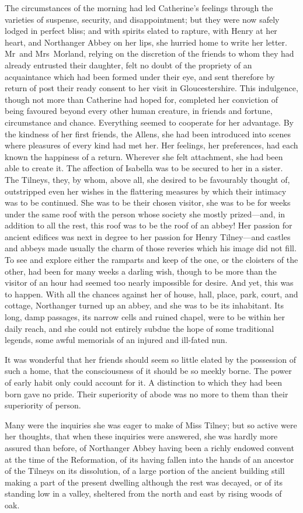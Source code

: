  The circumstances of the morning had led Catherine's feelings through the varieties of suspense, security, and disappointment; but they were now safely lodged in perfect bliss; and with spirits elated to rapture, with Henry at her heart, and Northanger Abbey on her lips, she hurried home to write her letter. Mr~and Mrs~Morland, relying on the discretion of the friends to whom they had already entrusted their daughter, felt no doubt of the propriety of an acquaintance which had been formed under their eye, and sent therefore by return of post their ready consent to her visit in Gloucestershire. This indulgence, though not more than Catherine had hoped for, completed her conviction of being favoured beyond every other human creature, in friends and fortune, circumstance and chance. Everything seemed to cooperate for her advantage. By the kindness of her first friends, the Allens, she had been introduced into scenes where pleasures of every kind had met her. Her feelings, her preferences, had each known the happiness of a return. Wherever she felt attachment, she had been able to create it. The affection of Isabella was to be secured to her in a sister. The Tilneys, they, by whom, above all, she desired to be favourably thought of, outstripped even her wishes in the flattering measures by which their intimacy was to be continued. She was to be their chosen visitor, she was to be for weeks under the same roof with the person whose society she mostly prized—and, in addition to all the rest, this roof was to be the roof of an abbey! Her passion for ancient edifices was next in degree to her passion for Henry Tilney—and castles and abbeys made usually the charm of those reveries which his image did not fill. To see and explore either the ramparts and keep of the one, or the cloisters of the other, had been for many weeks a darling wish, though to be more than the visitor of an hour had seemed too nearly impossible for desire. And yet, this was to happen. With all the chances against her of house, hall, place, park, court, and cottage, Northanger turned up an abbey, and she was to be its inhabitant. Its long, damp passages, its narrow cells and ruined chapel, were to be within her daily reach, and she could not entirely subdue the hope of some traditional legends, some awful memorials of an injured and ill-fated nun. 

 It was wonderful that her friends should seem so little elated by the possession of such a home, that the consciousness of it should be so meekly borne. The power of early habit only could account for it. A distinction to which they had been born gave no pride. Their superiority of abode was no more to them than their superiority of person. 

 Many were the inquiries she was eager to make of Miss Tilney; but so active were her thoughts, that when these inquiries were answered, she was hardly more assured than before, of Northanger Abbey having been a richly endowed convent at the time of the Reformation, of its having fallen into the hands of an ancestor of the Tilneys on its dissolution, of a large portion of the ancient building still making a part of the present dwelling although the rest was decayed, or of its standing low in a valley, sheltered from the north and east by rising woods of oak. 